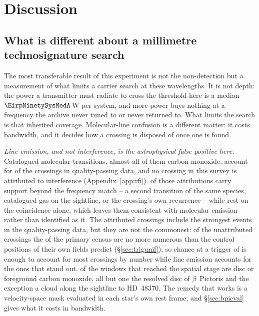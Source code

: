 \section{Discussion}
\label{sec:discussion}

\subsection{What is different about a millimetre technosignature search}
\label{sec:mmdifferent}

The most transferable result of this experiment is not the non-detection but
a measurement of what limits a carrier search at these wavelengths. It is not
depth: the power a transmitter must radiate to cross the threshold here is a median
$\EirpNinetySysMedA$\,W per system, and more power buys nothing at a
frequency the archive never tuned to or never returned to. What limits the
search is that inherited coverage. Molecular-line confusion is a different
matter: it costs bandwidth, and it decides how a crossing is disposed of once
one is found.

\emph{Line emission, and not interference, is the astrophysical false
positive here.}
Catalogued molecular transitions, almost all of them carbon monoxide, account
for \EvNAttrQp{} of the \EvNCrossQp{} crossings in quality-passing data, and
no crossing in this survey is attributed to interference
(Appendix~\ref{app:rfi}). \LnAttrSupp{} of those attributions carry support
beyond the frequency match -- a second transition of the same species,
catalogued gas on the sightline, or the crossing's own recurrence -- while
\LnAttrCoincWord{} rest on the coincidence alone, which leaves them
consistent with molecular emission rather than identified as it. The
attributed crossings include the strongest events in the quality-passing
data, but they are
not the commonest: of the \EvNUnattrQp{} unattributed crossings the \CeObs{}
of the primary census are no more numerous than the control positions of
their own fields predict
(\S\ref{sec:trigunif}), so chance at a trigger of \StageNullTrig{} is enough
to account for most crossings by number while line emission accounts for the
ones that stand out.
\DiscFpWin{} of the \DiscFpOfFlags{} windows that reached the spatial stage
are disc or foreground carbon monoxide, all but one the resolved disc of
$\beta$~Pictoris and the exception a cloud along the sightline to
HD~48370. The remedy that works is a velocity-space mask evaluated in each star's
own rest frame, and \S\ref{sec:bpicval} gives what it costs in
bandwidth.

